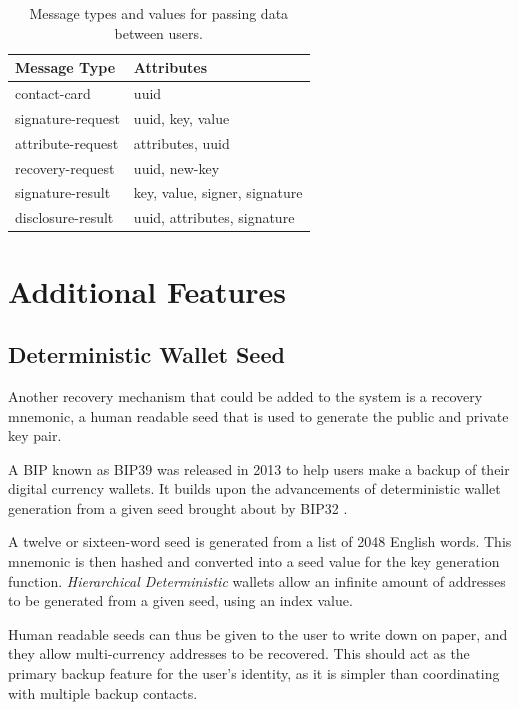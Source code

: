 \begin{table}[H]
	\centering
    \begin{tabular}{|p{4cm}|p{8cm}|}
       \hline \textbf{Message Type} & \textbf{Attributes} \\
       \hline contact-card & uuid \\
       \hline signature-request & uuid, key, value \\
       \hline attribute-request & attributes, uuid \\
       \hline recovery-request & uuid, new-key \\
       \hline signature-result & key, value, signer, signature \\
       \hline disclosure-result & uuid, attributes, signature \\
       \hline
    \end{tabular}
    \caption{Message types and values for passing data between users.}
    \label{tab:message-types}   
\end{table}

\section{Additional Features}
\subsection{Deterministic Wallet Seed}
Another recovery mechanism that could be added to the system is a recovery mnemonic, a human readable seed that is used to generate the public and private key pair.

A \ac{BIP} known as \ac{BIP}39 \cite{noauthor_bip-0039_nodate} was released in 2013 to help users make a backup of their digital currency wallets. It builds upon the advancements of deterministic wallet generation from a given seed brought about by \ac{BIP}32 \cite{noauthor_bip-0032_nodate}.

A twelve or sixteen-word seed is generated from a list of 2048 English words. This mnemonic is then hashed and converted into a seed value for the key generation function. \textit{Hierarchical Deterministic} wallets allow an infinite amount of addresses to be generated from a given seed, using an index value.

Human readable seeds can thus be given to the user to write down on paper, and they allow multi-currency addresses to be recovered. This should act as the primary backup feature for the user's identity, as it is simpler than coordinating with multiple backup contacts.


